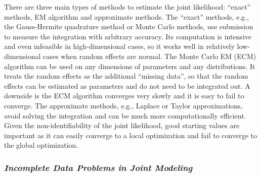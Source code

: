 There are three main types of methods to estimate the joint likelihood:  ``exact'' methods, EM algorithm and approximate methods.
The ``exact'' methods, e.g., the Gauss-Hermite quadrature method or Monte Carlo methods, use submission to measure the integration with arbitrary accuracy. Its computation is intensive and even infeasible in high-dimensional cases, so it works well in relatively low-dimensional cases when random effects are normal.
The Monte Carlo EM (ECM) algorithm can be used on any dimensions of parameters and any distributions. It treats the random effects as the additional ``missing data'', so that the random effects can be estimated as parameters and do not need to be integrated out. A downside is the ECM algorithm converges very slowly and it is easy to fail to converge.
The approximate methods, e.g., Laplace or Taylor approximations, avoid solving the integration and can be much more computationally efficient.
%
Given the non-identifiability of the joint likelihood, good starting values are important as it can easily converge to a local optimization and fail to converge to the global optimization. 


\subsubsection*{\textit{Incomplete Data Problems in Joint Modeling}}

